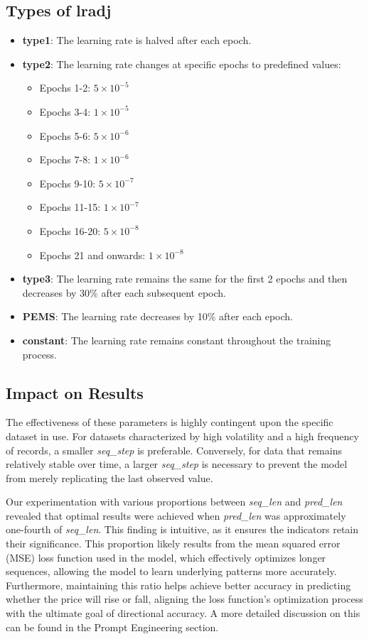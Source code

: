 \subsection{Types of \textbf{lradj}}
\begin{itemize}
	\item \textbf{type1}: The learning rate is halved after each epoch.
	\item \textbf{type2}: The learning rate changes at specific epochs to predefined values:
	      \begin{itemize}
		      \item Epochs 1-2: $5 \times 10^{-5}$
		      \item Epochs 3-4: $1 \times 10^{-5}$
		      \item Epochs 5-6: $5 \times 10^{-6}$
		      \item Epochs 7-8: $1 \times 10^{-6}$
		      \item Epochs 9-10: $5 \times 10^{-7}$
		      \item Epochs 11-15: $1 \times 10^{-7}$
		      \item Epochs 16-20: $5 \times 10^{-8}$
		      \item Epochs 21 and onwards: $1 \times 10^{-8}$
	      \end{itemize}
	\item \textbf{type3}: The learning rate remains the same for the first 2 epochs and then decreases by 30\% after each subsequent epoch.
	\item \textbf{PEMS}: The learning rate decreases by 10\% after each epoch.
	\item \textbf{constant}: The learning rate remains constant throughout the training process.
\end{itemize}

\subsection{Impact on Results}
The effectiveness of these parameters is highly contingent upon the specific dataset in use. For datasets characterized by high volatility and a high frequency of records, a smaller \textit{seq\_step} is preferable. Conversely, for data that remains relatively stable over time, a larger \textit{seq\_step} is necessary to prevent the model from merely replicating the last observed value.

Our experimentation with various proportions between \textit{seq\_len} and \textit{pred\_len} revealed that optimal results were achieved when \textit{pred\_len} was approximately one-fourth of \textit{seq\_len}. This finding is intuitive, as it ensures the indicators retain their significance. This proportion likely results from the mean squared error (MSE) loss function used in the model, which effectively optimizes longer sequences, allowing the model to learn underlying patterns more accurately. Furthermore, maintaining this ratio helps achieve better accuracy in predicting whether the price will rise or fall, aligning the loss function's optimization process with the ultimate goal of directional accuracy. A more detailed discussion on this can be found in the Prompt Engineering section.

